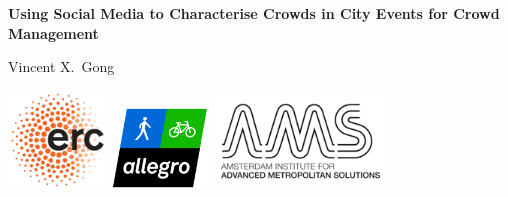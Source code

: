 \graphicspath{{./ch-x-others/images/}}



\newcommand{\thetitle}{Using Social Media to Characterise Crowds in City Events for Crowd Management} 
\newcommand{\thesubtitle}{} 
\newcommand{\theauthor}{Vincent X.\ Gong}


\pagestyle{fancy} %
\thispagestyle{empty}
\vspace*{30mm}

\begin{center}
    \textbf{\huge \thetitle}\\[\baselineskip]\textbf{\LARGE \thesubtitle}
\end{center}


\vspace{40mm}

\begin{center}
    \Large\theauthor
\end{center}

\newpage

\thispagestyle{empty}

\vspace*{\fill}

\noindent \includegraphics[width=7em]{erc.png}\hspace*{0.75cm}
\includegraphics[width=7em]{allegro.png}\hspace*{0.75cm}
\includegraphics[width=12.5em]{ams.png}\hspace*{0.75cm}\\

